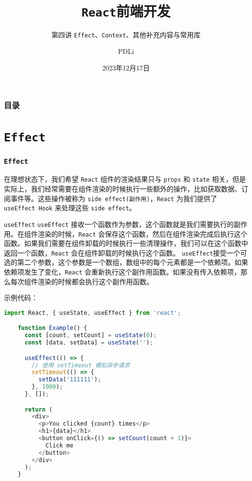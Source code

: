 \documentclass{beamer}
\title{\texttt{React}前端开发}
\subtitle{第四讲 \texttt{Effect}、\texttt{Context}、其他补充内容与常用库}
\author{PDLi}
\date{2023年12月17日}
\begin{document}
\begin{frame}
  \titlepage
\end{frame}
\begin{frame}
  \frametitle{目录}
  \tableofcontents
\end{frame}

\section{\texttt{Effect}}
\begin{frame}
  \frametitle{\texttt{Effect}}

  在理想状态下，我们希望 \texttt{React} 组件的渲染结果只与 \texttt{props} 和 \texttt{state} 相关，但是实际上，我们经常需要在组件渲染的时候执行一些额外的操作，比如获取数据、订阅事件等。这些操作被称为 \texttt{side effect(副作用)}，\texttt{React} 为我们提供了 \texttt{useEffect Hook} 来处理这些 \texttt{side effect}。

  \framebreak

  \begin{block}{\texttt{useEffect}}
    \texttt{useEffect} 接收一个函数作为参数，这个函数就是我们需要执行的副作用。在组件渲染的时候，\texttt{React} 会保存这个函数，然后在组件渲染完成后执行这个函数。如果我们需要在组件卸载的时候执行一些清理操作，我们可以在这个函数中返回一个函数，\texttt{React} 会在组件卸载的时候执行这个函数。
    \texttt{useEffect}接受一个可选的第二个参数，这个参数是一个数组，数组中的每个元素都是一个依赖项。如果依赖项发生了变化，\texttt{React} 会重新执行这个副作用函数。如果没有传入依赖项，那么每次组件渲染的时候都会执行这个副作用函数。
  \end{block}

  \framebreak

  示例代码：
  \begin{lstlisting}[language=JavaScript]
    import React, { useState, useEffect } from 'react';

    function Example() {
      const [count, setCount] = useState(0);
      const [data, setData] = useState('');

      useEffect(() => {
        // 使用 setTimeout 模拟异步请求
        setTimeout(() => {
          setData('111111');
        }, 1000);
      }, []);

      return (
        <div>
          <p>You clicked {count} times</p>
          <h1>{data}</h1>
          <button onClick={() => setCount(count + 1)}>
            Click me
          </button>
        </div>
      );
    }
  \end{lstlisting}


\end{frame}
\end{document}
